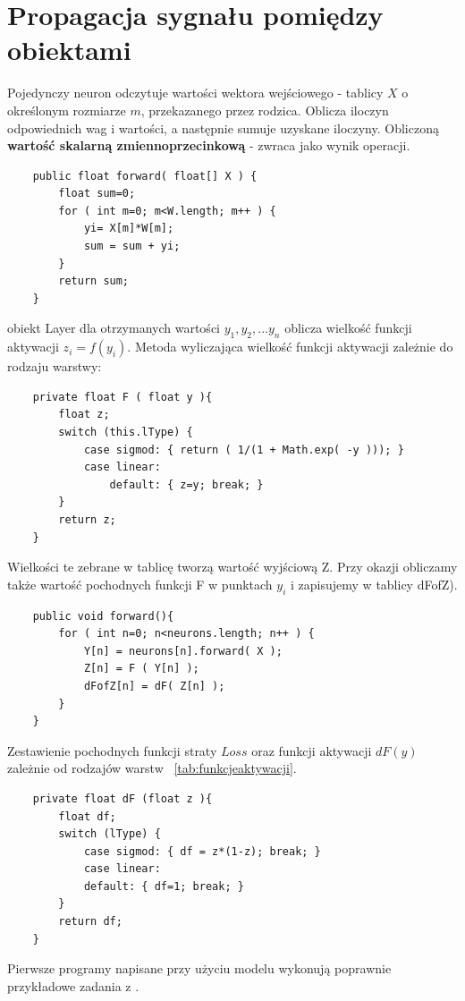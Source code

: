 \section{ Propagacja sygnału pomiędzy obiektami }
Pojedynczy neuron odczytuje wartości wektora wejściowego - tablicy \(X\) o określonym rozmiarze \(m\), przekazanego przez rodzica. Oblicza iloczyn odpowiednich wag i wartości, a następnie sumuje uzyskane iloczyny. Obliczoną \textbf{wartość skalarną zmiennoprzecinkową} - zwraca jako wynik operacji.
\newline
\begin{lstlisting}
    public float forward( float[] X ) {
        float sum=0;
        for ( int m=0; m<W.length; m++ ) {
            yi= X[m]*W[m];
            sum = sum + yi;
        }
        return sum;
    }
\end{lstlisting}
obiekt Layer dla otrzymanych wartości \(y_1, y_2, ... y_n\) oblicza wielkość funkcji aktywacji \(z_i = f(y_i)\). 
Metoda wyliczająca wielkość funkcji aktywacji zależnie do rodzaju warstwy:
\begin{lstlisting}
    private float F ( float y ){
        float z;
        switch (this.lType) {
            case sigmod: { return ( 1/(1 + Math.exp( -y ))); }
            case linear:
                default: { z=y; break; }
        }
        return z;
    }
\end{lstlisting}

Wielkości te zebrane w tablicę tworzą wartość wyjściową Z. 
Przy okazji obliczamy także wartość pochodnych funkcji F w punktach \(y_i\) i zapisujemy w tablicy dFofZ).

\begin{lstlisting}
    public void forward(){
        for ( int n=0; n<neurons.length; n++ ) {
            Y[n] = neurons[n].forward( X );
            Z[n] = F ( Y[n] );
            dFofZ[n] = dF( Z[n] );
        }
    }
\end{lstlisting}

Zestawienie pochodnych funkcji straty \(Loss\) oraz funkcji aktywacji \(dF(y)\) zależnie od rodzajów warstw ~\ref{tab:funkcjeaktywacji}.

\begin{lstlisting}
    private float dF (float z ){
        float df;
        switch (lType) {
            case sigmod: { df = z*(1-z); break; }
            case linear:
            default: { df=1; break; }
        }
        return df;
    }
\end{lstlisting}


Pierwsze programy napisane przy użyciu modelu wykonują poprawnie przykładowe zadania z \cite{profWłodzimierzKasprzak2024wyklad}.





